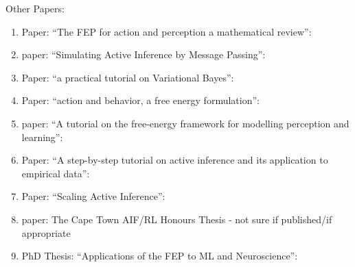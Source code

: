 \documentclass[onecolumn]{IEEEtran}
\begin{document}
Other Papers:
\begin{enumerate}
	\item Paper: ``The FEP for action and perception a mathematical review'': \textcite{FEP-Mathematical-Review}
	\item paper: ``Simulating Active Inference by Message Passing'': \textcite{Simulating-AIF-By-Message-Passing}
	\item Paper: ``a practical tutorial on Variational Bayes'': \textcite{Practical-Tutorial-Variational-Bayes}
	\item Paper: ``action and behavior, a free energy formulation'': \textcite{Action-Behaviour-FE}
	\item paper: ``A tutorial on the free-energy framework for modelling perception and learning'': \textcite{Tutorial-FEP-Modelling-Perception-Action}
	\item Paper: “A step-by-step tutorial on active inference and its application to empirical data'': \textcite{Step-by-Step-Tutorial-AIF-Empirical-Data}
	\item Paper: ``Scaling Active Inference'': \textcite{Scaling-AIF}
	\item paper: The Cape Town AIF/RL Honours Thesis - not sure if published/if appropriate
	\item PhD Thesis: ``Applications of the FEP to ML and Neuroscience'': \textcite{Applications-of-FEP-Machine-Learning-Neuroscience}
\end{enumerate}

% 
\printbibliography
\end{document}
